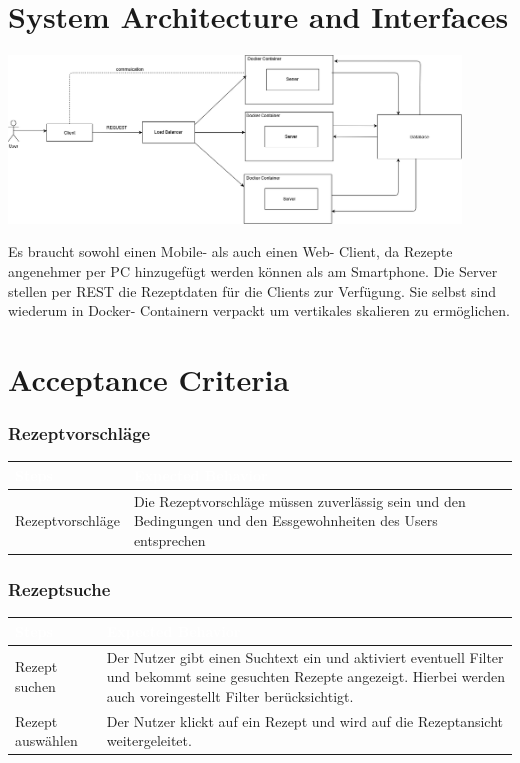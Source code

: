 \documentclass[12pt]{article}
\theoremstyle{definition}
\begin{document}
\pagebreak
\section{System Architecture and Interfaces}

\begin{center}
    \includegraphics[width=0.9\textwidth]{res/images/System Architecture.png}
\end{center}

\noindent Es braucht sowohl einen Mobile- als auch einen Web- Client, da Rezepte angenehmer per PC hinzugefügt werden können als am Smartphone. Die Server stellen per REST die Rezeptdaten für die Clients zur Verfügung. Sie selbst sind wiederum in Docker- Containern verpackt um vertikales skalieren zu ermöglichen. 

\pagebreak
\section{Acceptance Criteria} 

\subsubsection{Rezeptvorschläge}
\begin{tabular}{|p{.3\linewidth}|p{.7\linewidth}|}
\hline
\cellcolor[gray]{0.5}\textcolor{white}{Steps} & \cellcolor[gray]{0.5}\textcolor{white}{Expected Behavior}\\ \hline
Rezeptvorschläge&Die Rezeptvorschläge müssen zuverlässig sein und den Bedingungen und den Essgewohnheiten des Users entsprechen \\\hline
\end{tabular}

\subsubsection{Rezeptsuche}
\begin{tabular}{|p{.3\linewidth}|p{.7\linewidth}|}
\hline
\cellcolor[gray]{0.5}\textcolor{white}{Steps} & \cellcolor[gray]{0.5}\textcolor{white}{Expected Behavior} \\ \hline
Rezept suchen&Der Nutzer gibt einen Suchtext ein und aktiviert eventuell Filter und bekommt seine gesuchten Rezepte angezeigt. Hierbei werden auch voreingestellt Filter berücksichtigt.\\\hline
Rezept auswählen&Der Nutzer klickt auf ein Rezept und wird auf die Rezeptansicht weitergeleitet.\\\hline
\end{tabular}
\end{document}

